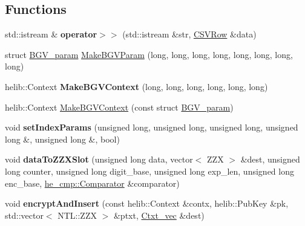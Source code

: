 \subsection*{Functions}
\begin{DoxyCompactItemize}
\item 
\mbox{\label{namespaceHDB__supergate___a6f4d992f1677f3406407ad6090818211}} 
std\+::istream \& {\bfseries operator$>$$>$} (std\+::istream \&str, \hyperlink{classHDB__supergate___1_1CSVRow}{C\+S\+V\+Row} \&data)
\item 
struct \hyperlink{structHDB__supergate___1_1BGV__param}{B\+G\+V\+\_\+param} \hyperlink{namespaceHDB__supergate___affa422b55e184c2fd69134364e309fbb}{Make\+B\+G\+V\+Param} (long, long, long, long, long, long, long, long)
\item 
\mbox{\label{namespaceHDB__supergate___a25f457f93b50fef2dcdb25e044d6cd7c}} 
helib\+::\+Context {\bfseries Make\+B\+G\+V\+Context} (long, long, long, long, long, long)
\item 
helib\+::\+Context \hyperlink{namespaceHDB__supergate___a8a0616d8c5b340d3ff4b663fa841fc51}{Make\+B\+G\+V\+Context} (const struct \hyperlink{structHDB__supergate___1_1BGV__param}{B\+G\+V\+\_\+param})
\item 
\mbox{\label{namespaceHDB__supergate___a0891908122d714a0a40533f348800b64}} 
void {\bfseries set\+Index\+Params} (unsigned long, unsigned long, unsigned long, unsigned long \&, unsigned long \&, bool)
\item 
\mbox{\label{namespaceHDB__supergate___a02ca20243e923d4a0c34d8feb4fc4088}} 
void {\bfseries data\+To\+Z\+Z\+X\+Slot} (unsigned long data, vector$<$ Z\+ZX $>$ \&dest, unsigned long counter, unsigned long digit\+\_\+base, unsigned long exp\+\_\+len, unsigned long enc\+\_\+base, \hyperlink{classhe__cmp_1_1Comparator}{he\+\_\+cmp\+::\+Comparator} \&comparator)
\item 
\mbox{\label{namespaceHDB__supergate___a6eb55ba8f055d3208533a3bd27ce0dc1}} 
void {\bfseries encrypt\+And\+Insert} (const helib\+::\+Context \&contx, helib\+::\+Pub\+Key \&pk, std\+::vector$<$ N\+T\+L\+::\+Z\+ZX $>$ \&ptxt, \hyperlink{namespaceHDB__supergate___ade0781b5973aae08b689ed72b30511fb}{Ctxt\+\_\+vec} \&dest)

\end{DoxyCompactItemize}
